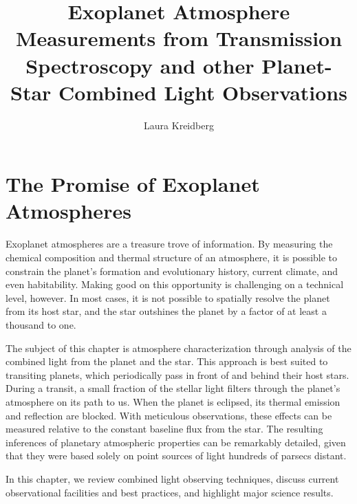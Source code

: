 \documentclass[graybox,natbib,nosecnum]{svmult}
\begin{document}
\title*{Exoplanet Atmosphere Measurements from Transmission Spectroscopy and other Planet-Star Combined Light Observations}
\author{Laura Kreidberg}
%
%
\maketitle



\section{The Promise of Exoplanet Atmospheres}
Exoplanet atmospheres are a treasure trove of information. By measuring the chemical composition and thermal structure of an atmosphere, it is possible to constrain the planet's formation and evolutionary history, current climate, and even habitability.  Making good on this opportunity is challenging on a technical level, however. In most cases, it is not possible to spatially resolve the planet from its host star, and the star outshines the planet by a factor of at least a thousand to one. 

The subject of this chapter is atmosphere characterization through analysis of the combined light from the planet and the star. This approach is best suited to transiting planets, which periodically pass in front of and behind their host stars. During a transit, a small fraction of the stellar light filters through the planet's atmosphere on its path to us. When the planet is eclipsed, its thermal emission and reflection are blocked.  With meticulous observations, these effects can be measured relative to the constant baseline flux from the star. The resulting inferences of planetary atmospheric properties can be remarkably detailed, given that they were based solely on point sources of light hundreds of parsecs distant.

In this chapter, we review combined light observing techniques, discuss current observational facilities and best practices, and highlight major science results.
\end{document}
